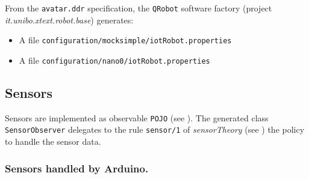 From the \texttt{avatar.ddr} specification, the \texttt{QRobot} software factory (project \textit{it.unibo.xtext.robot.base}) generates:
\begin{itemize}
\item A file \texttt{configuration/mocksimple/iotRobot.properties} 


\item A file \texttt{configuration/nano0/iotRobot.properties} 


\end{itemize}

 
\subsection{Sensors}

Sensors are implemented as observable \texttt{POJO} (see ). The generated class \texttt{SensorObserver} delegates to the rule \texttt{sensor/1} of \textit{sensorTheory} (see ) the policy to handle the sensor data.





\subsubsection{Sensors handled by Arduino.}

